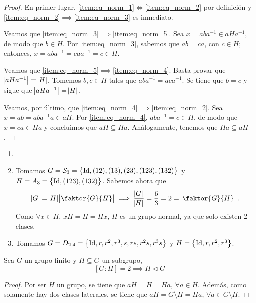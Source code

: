 \begin{proof}
    En primer lugar, \ref{item:eq_norm_1}$\iff$\ref{item:eq_norm_2} por definición y \ref{item:eq_norm_2}$\implies$\ref{item:eq_norm_3} es inmediato.
    
    \noindent Veamos que \ref{item:eq_norm_3}$\implies$\ref{item:eq_norm_5}. Sea $x=aba^{-1}\in aHa^{-1}$, de modo que $b\in H$. Por \ref{item:eq_norm_3}, sabemos que $ab=ca$, con $c\in H$; entonces, $x=aba^{-1}=caa^{-1}=c\in H$.
    
    \noindent Veamos que \ref{item:eq_norm_5}$\implies$\ref{item:eq_norm_4}. Basta provar que $\abs{aHa^{-1}}=\abs{H}$. Tomemos $b, c\in H$ tales que $aba^{-1}=aca^{-1}$. Se tiene que $b=c$ y sigue que $\abs{aHa^{-1}}=\abs{H}$.
    
    \noindent Veamos, por último, que \ref{item:eq_norm_4}$\implies$\ref{item:eq_norm_2}. Sea $x=ab=aba^{-1}a\in aH$. Por \ref{item:eq_norm_4}, $aba^{-1}=c\in H$, de modo que $x=ca\in Ha$ y concluimos que $aH\subseteq Ha$. Análogamente, tenemos que $Ha\subseteq aH$.
\end{proof}

\begin{example}
    \begin{enumerate}[1.]
        \item[]
        \item Tomamos $G = \mathcal{S}_3 = \left\{\operatorname{Id}, (12), (13), (23), (123), (132)\right\}$ y
            $H = A_3 = \left\{\operatorname{Id}, (123), (132)\right\}$. Sabemos ahora que
            \[
                \abs{G} = \abs{H}\abs{\faktor{G}{H}} \implies
                \frac{\abs{G}}{\abs{H}} = \frac{6}{3} = 2 = \abs{\faktor{G}{H}}.
            \]
            Como $\forall x \in H, \, xH = H = Hx$, $H$ es un grupo normal, ya que solo existen 2 clases.
        \item Tomamos $G = D_{2 \cdot 4} = \left\{\operatorname{Id}, r, r^2, r^3, s, rs, r^2s, r^3s\right\}$ y
            $H = \left\{ \operatorname{Id}, r, r^2, r^3\right\}$.
    \end{enumerate}
\end{example}

\begin{prop}
    Sea $G$ un grupo finito y $H \subseteq G$ un subgrupo,
    \[
        [G:H] = 2 \implies H \triangleleft G
    \]
\end{prop}
\begin{proof}
    Por ser $H$ un grupo, se tiene que $aH=H=Ha, \,\forall a\in H$. Además, como solamente hay dos clases laterales, se tiene que $aH=G\setminus H=Ha,\,\forall a\in G\setminus H$.
\end{proof}


